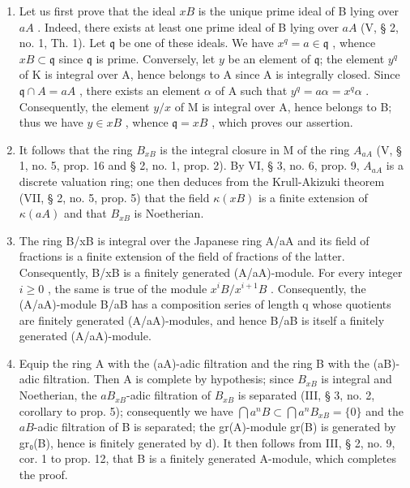 \begin{enumerate}
\def\labelenumi{\alph{enumi})}
\setcounter{enumi}{1}
\item
  Let us first prove that the ideal \(xB\) is the unique prime ideal of B lying over \(aA\) . Indeed, there exists at least one prime ideal of B lying over \(aA\) (V, § 2, no. 1, Th. 1). Let \(\mathfrak{q}\) be one of these ideals. We have \(x^{q} = a \in \mathfrak{q}\) , whence \(xB \subset \mathfrak{q}\) since \(\mathfrak{q}\) is prime. Conversely, let \(y\) be an element of \(\mathfrak{q}\); the element \(y^{q}\) of K is integral over A, hence belongs to A since A is integrally closed. Since \(\mathfrak{q} \cap A = aA\) , there exists an element \(\alpha\) of A such that \(y^{q} = a\alpha = x^{q}\alpha\) . Consequently, the element \(y/x\) of M is integral over A, hence belongs to B; thus we have \(y \in xB\) , whence \(\mathfrak{q} = xB\) , which proves our assertion.
\item
  It follows that the ring \(B_{xB}\) is the integral closure in M of the ring \(A_{aA}\) (V, § 1, no. 5, prop. 16 and § 2, no. 1, prop. 2). By VI, § 3, no. 6, prop. 9, \(A_{aA}\) is a discrete valuation ring; one then deduces from the Krull-Akizuki theorem (VII, § 2, no. 5, prop. 5) that the field \(\kappa(xB)\) is a finite extension of \(\kappa(aA)\) and that \(B_{xB}\) is Noetherian.
\item
  The ring B/xB is integral over the Japanese ring A/aA and its field of fractions is a finite extension of the field of fractions of the latter. Consequently, B/xB is a finitely generated (A/aA)-module. For every integer \(i \geqslant 0\) , the same is true of the module \(x^{i}B/x^{i+1}B\) . Consequently, the (A/aA)-module B/aB has a composition series of length q whose quotients are finitely generated (A/aA)-modules, and hence B/aB is itself a finitely generated (A/aA)-module.
\item
  Equip the ring A with the (aA)-adic filtration and the ring B with the (aB)-adic filtration. Then A is complete by hypothesis; since \(B_{xB}\) is integral and Noetherian, the \(aB_{xB}\)-adic filtration of \(B_{xB}\) is separated (III, § 3, no. 2, corollary to prop. 5); consequently we have \(\bigcap a^{n}B \subset \bigcap a^{n}B_{xB} = \{0\}\) and the \(aB\)-adic filtration of B is separated; the gr(A)-module gr(B) is generated by gr₀(B), hence is finitely generated by d). It then follows from III, § 2, no. 9, cor. 1 to prop. 12, that B is a finitely generated A-module, which completes the proof.
\end{enumerate}

